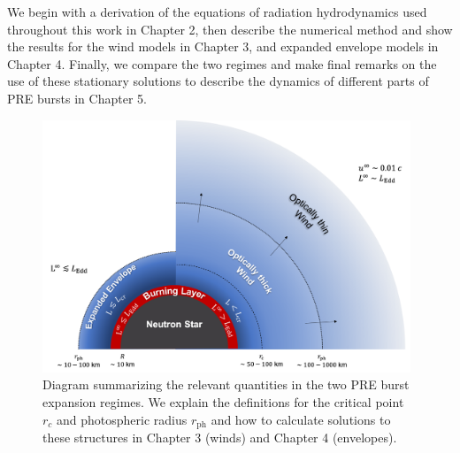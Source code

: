 \documentclass[../main.tex]{subfiles}
\begin{document}
We begin with a derivation of the equations of radiation hydrodynamics used throughout this work in Chapter 2, then describe the numerical method and show the results for the wind models in Chapter 3, and expanded envelope models in Chapter 4. Finally, we compare the two regimes and make final remarks on the use of these stationary solutions to describe the dynamics of different parts of PRE bursts in Chapter 5.

\begin{figure}[htb!]
    \centering
    \includegraphics[width=0.98\textwidth]{figures/diagram.png}
    \vspace*{-3mm}
    \caption[Diagram of PRE burst expansion regimes]{Diagram summarizing the relevant quantities in the two PRE burst expansion regimes. We explain the definitions for the critical point $r_c$ and photospheric radius $r_\text{ph}$ and how to calculate solutions to these structures in Chapter 3 (winds) and Chapter 4 (envelopes).}
    \label{fig:diagram}
\end{figure}

\biblio
\end{document}
